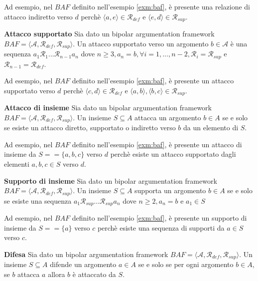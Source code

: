 Ad esempio, nel $BAF$ definito nell'esempio \ref{exm:baf}, è presente una relazione di attacco indiretto verso $d$ perchè $⟨a, e⟩ ∈ \mathcal{R}_{def}$ e $⟨e, d⟩ ∈ \mathcal{R}_{sup}$.


\bigskip
\begin{defn} \textbf{Attacco supportato} 
Sia dato un bipolar argumentation framework $BAF = ⟨\mathcal{A}, \mathcal{R}_{def}, \mathcal{R}_{sup}⟩$. Un attacco supportato verso un argomento $b ∈ \mathcal{A}$ è una sequenza $a_{1}\mathcal{R}_{1}...\mathcal{R}_{n-1}a_{n}$ dove $n \geq 3, a_n = b, \forall i = 1, ..., n-2, \mathcal{R}_i = \mathcal{R}_{sup}$ e $ \mathcal{R}_{n-1} = \mathcal{R}_{def}$.
\label{defn:asbaf}
\end{defn}

Ad esempio, nel $BAF$ definito nell'esempio \ref{exm:baf}, è presente un attacco supportato verso $d$ perchè $⟨c, d⟩ ∈ \mathcal{R}_{def}$ e $⟨a, b⟩, ⟨b, c⟩ ∈ \mathcal{R}_{sup}$.


\bigskip
\begin{defn} \textbf{Attacco di insieme} 
Sia dato un bipolar argumentation framework $BAF = ⟨\mathcal{A}, \mathcal{R}_{def}, \mathcal{R}_{sup}⟩$. Un insieme $S \subseteq A$ attacca un argomento $b \in A$ se e solo se esiste un attacco diretto, supportato o indiretto verso $b$ da un elemento di $S$.
\label{defn:adibaf}
\end{defn}

Ad esempio, nel $BAF$ definito nell'esempio \ref{exm:baf}, è presente un attacco di insieme da $S = =\{a, b, c\}$ verso $d$ perchè esiste un attacco supportato dagli elementi $a, b, c \in S$ verso $d$.


\bigskip
\begin{defn} \textbf{Supporto di insieme} 
Sia dato un bipolar argumentation framework $BAF = ⟨\mathcal{A}, \mathcal{R}_{def}, \mathcal{R}_{sup}⟩$. Un insieme $S \subseteq A$ supporta un argomento $b \in A$ se e solo se esiste una sequenza $a_{1}\mathcal{R}_{sup}...\mathcal{R}_{sup}a_{n}$ dove $n \geq 2, a_n = b$ e $a_1 \in S$
\label{defn:sdibaf}
\end{defn}

Ad esempio, nel $BAF$ definito nell'esempio \ref{exm:baf}, è presente un supporto di insieme da $S = =\{a\}$ verso $c$ perchè esiste una sequenza di supporti da $a \in S$ verso $c$.


\bigskip
\begin{defn} \textbf{Difesa} 
Sia dato un bipolar argumentation framework $BAF = ⟨\mathcal{A}, \mathcal{R}_{def}, \mathcal{R}_{sup}⟩$. Un insieme $S \subseteq A$ difende un argomento $a \in A$ se e solo se per ogni argomento $b \in A$, se $b$ attacca $a$ allora $b$ è attaccato da $S$.
\label{defn:dbaf}
\end{defn}

